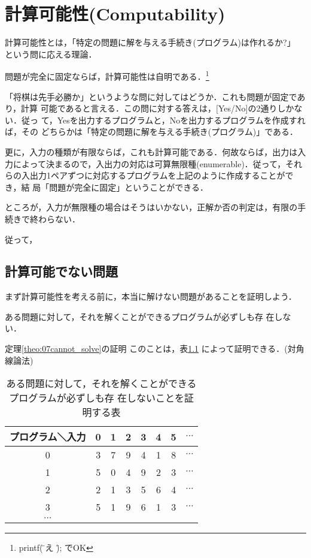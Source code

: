 \chapter{計算可能性(Computability)}
計算可能性とは，「特定の問題に解を与える手続き(プログラム)は作れるか?」
という問に応える理論．

問題が完全に固定ならば，計算可能性は自明である．\footnote{printf(\"答え
\"); でOK}

「将棋は先手必勝か」というような問に対してはどうか．これも問題が固定であ
り，計算
可能であると言える．この問に対する答えは，[Yes/No]の2通りしかない．従っ
て，Yesを出力するプログラムと，Noを出力するプログラムを作成すれば，その
どちらかは「特定の問題に解を与える手続き(プログラム)」である．

更に，入力の種類が有限ならば，これも計算可能である．何故ならば，出力は入
力によって決まるので，入出力の対応は可算無限種(enumerable)．従って，それ
らの入出力1ペアずつに対応するプログラムを上記のように作成することができ，結
局「問題が完全に固定」ということができる．

ところが，入力が無限種の場合はそうはいかない，正解か否の判定は，有限の手
続きで終わらない．

従って，


\section{計算可能でない問題}

まず計算可能性を考える前に，本当に解けない問題があることを証明しよう．

\begin{mytheorem} \label{theo:07cannot_solve}
 ある問題に対して，それを解くことができるプログラムが必ずしも存
 在しない．
\end{mytheorem}

\begin{myproof}{定理\ref{theo:07cannot_solve}の証明}
このことは，表\ref{tb:07cannot_solve}
 によって証明できる．(対角線論法) \footnotemark
\end{myproof}
 

\begin{table}
 \caption{ある問題に対して，それを解くことができるプログラムが必ずしも存
 在しないことを証明する表}
 \begin{center}
  \begin{tabular}{c|c|c|c|c|c|c|c}
   \hline
   プログラム＼入力 &0&1&2&3&4&5&$\cdots$ \\
    \hline \hline
   0&3&7&9&4&1&8&$\cdots$\\ \hline
   1&5&0&4&9&2&3&$\cdots$\\ \hline
   2&2&1&3&5&6&4&$\cdots$\\ \hline
   3&5&1&9&6&1&3&$\cdots$\\ \hline
   $\cdots$&&&&&&\\ \hline
  \end{tabular}
  \label{tb:07cannot_solve}
 \end{center}
\end{table}

